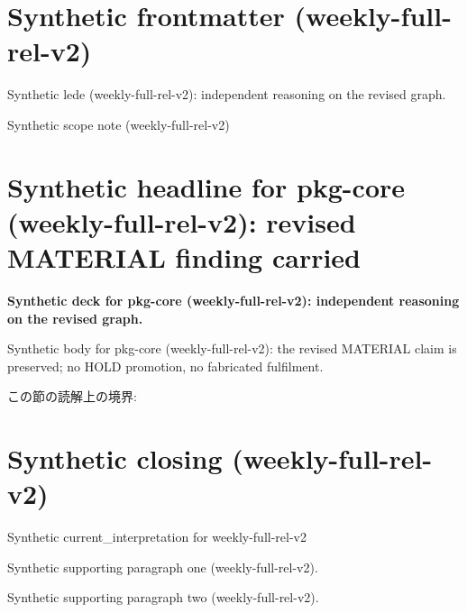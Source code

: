 \documentclass[lualatex,a4paper,10pt]{jlreq}
\begin{document}
\surveycover
\clearpage
\section*{Synthetic frontmatter (weekly-full-rel-v2)}
Synthetic lede (weekly-full-rel-v2): independent reasoning on the revised graph.

\begin{claimboundary}
\noindent Synthetic scope note (weekly-full-rel-v2)\par
\end{claimboundary}
\clearpage
\twocolumn
\section{Synthetic headline for pkg-core (weekly-full-rel-v2): revised MATERIAL finding carried}
\label{pkg:pkg-core}
\noindent\textbf{Synthetic deck for pkg-core (weekly-full-rel-v2): independent reasoning on the revised graph.} \cite{w2026-W33target-source}\par\medskip
\noindent Synthetic body for pkg-core (weekly-full-rel-v2): the revised MATERIAL claim is preserved; no HOLD promotion, no fabricated fulfilment.\par\medskip
\begin{claimboundary}
この節の読解上の境界: 
\end{claimboundary}
\clearpage
\onecolumn
\section{Synthetic closing (weekly-full-rel-v2)}
\label{sec:issue-summary}
\noindent Synthetic current\_interpretation for weekly-full-rel-v2\par\medskip
\noindent Synthetic supporting paragraph one (weekly-full-rel-v2).\par\medskip
\noindent Synthetic supporting paragraph two (weekly-full-rel-v2).\par\medskip
\clearpage
\onecolumn
\printbibliography[title={References / Source Notes}]
\end{document}
